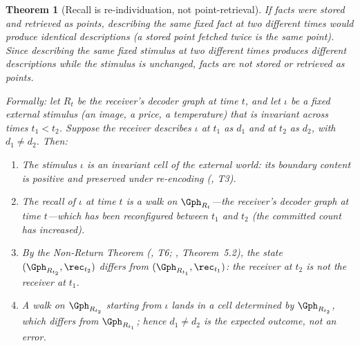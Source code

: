 \documentclass[twocolumn,11pt,a4paper]{article}
\theoremstyle{adv}
\newtheorem{theorem}{Theorem}[section]
\theoremstyle{definition}
\theoremstyle{remark}
\newcommand{\Recv}{R}                  %
\begin{document}
\begin{theorem}[Recall is re-individuation, not point-retrieval]
\label{thm:recall-reindividuation}
If facts were stored and retrieved as points, describing the same fixed fact
at two different times would produce identical descriptions (a stored point
fetched twice is the same point). Since describing the same fixed stimulus
at two different times produces different descriptions while the stimulus is
unchanged, facts are not stored or retrieved as points.

Formally: let $\Recv_t$ be the receiver's decoder graph at time $t$, and
let $\iota$ be a fixed external stimulus (an image, a price, a temperature)
that is invariant across times $t_1 < t_2$. Suppose the receiver describes
$\iota$ at $t_1$ as $d_1$ and at $t_2$ as $d_2$, with $d_1 \neq d_2$. Then:
\begin{enumerate}[label=\textup{(\roman*)},leftmargin=2.2em]
\item The stimulus $\iota$ is an invariant cell of the external world: its
      boundary content is positive and preserved under re-encoding
      \textup{(}\citealt{sachikonye2025contact}, T3\textup{)}.
\item The recall of $\iota$ at time $t$ is a walk on $\Gph_{\Recv_t}$---the
      receiver's decoder graph \emph{at time $t$}---which has been
      reconfigured between $t_1$ and $t_2$ \textup{(}the committed count has
      increased\textup{)}.
\item By the Non-Return Theorem \textup{(}\citealt{sachikonye2025contact}, T6;
      \citealt{sachikonye2025knowledge}, Theorem~5.2\textup{)}, the state
      $(\Gph_{\Recv_{t_2}}, \rec_{t_2})$ differs from $(\Gph_{\Recv_{t_1}},
      \rec_{t_1})$: the receiver at $t_2$ is not the receiver at $t_1$.
\item A walk on $\Gph_{\Recv_{t_2}}$ starting from $\iota$ lands in a cell
      determined by $\Gph_{\Recv_{t_2}}$, which differs from
      $\Gph_{\Recv_{t_1}}$; hence $d_1 \neq d_2$ is the expected outcome,
      not an error.
\end{enumerate}
\end{theorem}
\end{document}
